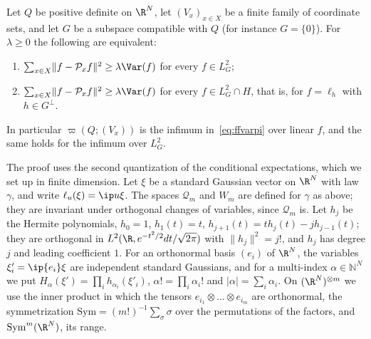 \begin{theorem}\label{thm:ffchaos}
Let $Q$ be positive definite on $\R^N$, let $(V_x)_{x\in X}$ be a finite
family of coordinate sets, and let $G$ be a subspace compatible with $Q$
(for instance $G=\{0\}$). For $\lambda\ge0$ the following are equivalent:
\begin{enumerate}[label=\textup{(\roman*)},leftmargin=*]
\item $\sum_{x\in X}\lVert f-\mathcal P_xf\rVert^2\ge\lambda\Var(f)$ for
every $f\in L^2_G$;
\item $\sum_{x\in X}\lVert f-\mathcal P_xf\rVert^2\ge\lambda\Var(f)$ for
every $f\in L^2_G\cap H$, that is, for $f=\ell_h$ with $h\in G^\perp$.
\end{enumerate}
In particular $\varpi(Q;(V_x))$ is the infimum in~\eqref{eq:ffvarpi} over
linear $f$, and the same holds for the infimum over $L^2_G$.
\end{theorem}

The proof uses the second quantization of the conditional expectations,
which we set up in finite dimension. Let $\xi$ be a standard Gaussian vector
on $\R^N$ with law $\gamma$, and write $\ell_u(\xi)=\ip u\xi$. The spaces
$\mathcal Q_m$ and $W_m$ are defined for $\gamma$ as above; they are
invariant under orthogonal changes of variables, since $\mathcal Q_m$ is.
Let $h_j$ be the Hermite polynomials, $h_0=1$, $h_1(t)=t$, $h_{j+1}(t)=
th_j(t)-jh_{j-1}(t)$; they are orthogonal in $L^2(\R,e^{-t^2/2}dt/\sqrt{2
\pi})$ with $\lVert h_j\rVert^2=j!$, and $h_j$ has degree $j$ and leading
coefficient $1$. For an orthonormal basis $(e_i)$ of $\R^N$, the variables
$\xi'_i=\ip{e_i}\xi$ are independent standard Gaussians, and for a
multi-index $\alpha\in\mathbb N^N$ we put $H_\alpha(\xi')=\prod_ih_{\alpha_i}
(\xi'_i)$, $\alpha!=\prod_i\alpha_i!$ and $\lvert\alpha\rvert=\sum_i
\alpha_i$. On $(\R^N)^{\otimes m}$ we use the inner product in which the
tensors $e_{i_1}\otimes\dots\otimes e_{i_m}$ are orthonormal, the
symmetrization $\mathrm{Sym}=(m!)^{-1}\sum_\sigma\sigma$ over the
permutations of the factors, and $\mathrm{Sym}^m(\R^N)$, its range.

